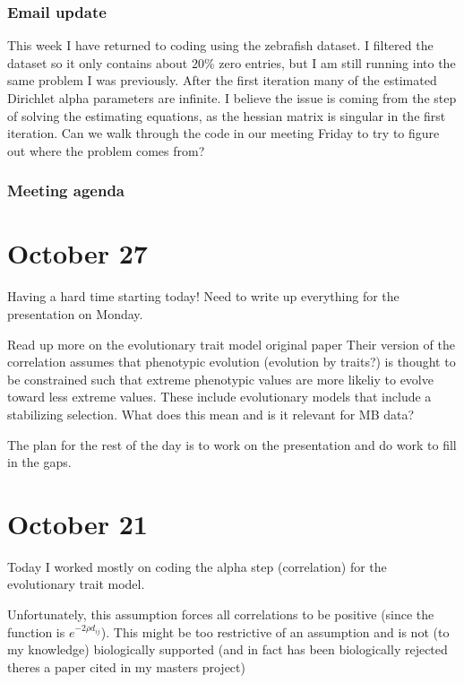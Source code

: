 \documentclass[10pt]{article}
\begin{document}
\subsubsection*{Email update}
This week I have returned to coding using the zebrafish dataset. I filtered the dataset so it only contains about 20\% zero entries, but I am still running into the same problem I was previously. After the first iteration many of the estimated Dirichlet alpha parameters are infinite. I believe the issue is coming from the step of solving the estimating equations, as the hessian matrix is singular in the first iteration. Can we walk through the code in our meeting Friday to try to figure out where the problem comes from?

\subsubsection*{Meeting agenda}

\hrulefill

\section{October 27}

Having a hard time starting today! Need to write up everything for the presentation on Monday.

Read up more on the evolutionary trait model original paper \cite{Martins1997}
Their version of the correlation assumes that phenotypic evolution (evolution by traits?) is thought to be constrained such that extreme phenotypic values are more likeliy to evolve toward less extreme values. These include evolutionary models that include a stabilizing selection. What does this mean and is it relevant for MB data?

The plan for the rest of the day is to work on the presentation and do work to fill in the gaps.



\section{October 21}


Today I worked mostly on coding the alpha step (correlation) for the evolutionary trait model.

Unfortunately, this assumption forces all correlations to be positive (since the function is $e^{-2\rho d_{ij}}$). This might be too restrictive of an assumption and is not (to my knowledge) biologically supported (and in fact has been biologically rejected theres a paper cited in my masters project)
\end{document}
